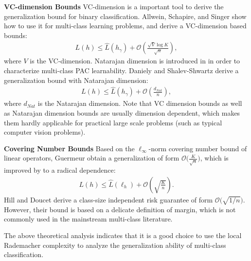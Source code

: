 \documentclass{article}
\begin{document}
\textbf{VC-dimension Bounds}
VC-dimension is a important tool to derive the generalization bound for binary classification.
Allwein, Schapire, and Singer  show how to use it
for multi-class learning problems,
and derive a VC-dimension based bounds:
\begin{align*}
   L(h)\leq  \hat{L}(h_\gamma) +\mathcal{O}\left(\frac{\sqrt{V}\log K}{\sqrt{n}}\right),
\end{align*}
where $V$ is the VC-dimension.
Natarajan dimension is introduced in \cite{Natarajan1989} in
order to characterize multi-class PAC learnability.
Daniely and Shalev-Shwartz  derive a generalization bound with Natarajan dimension:
\begin{align*}
   L(h)\leq  \hat{L}(h_\gamma) +\mathcal{O}\left(\frac{d_{Nat}}{n}\right),
\end{align*}
where $d_{Nat}$ is the Natarajan dimension.
Note that VC dimension bounds as well as Natarajan dimension bounds are usually dimension
dependent, which makes them hardly applicable for practical large
scale problems (such as typical computer vision problems).

\textbf{Covering Number Bounds}
Based on the $\ell_\infty$-norm covering number bound of
linear operators, Guermeur  obtain
a generalization of form $\mathcal{O}\big(\frac{K}{\sqrt{n}}\big)$,
which is improved by \cite{zhang2004statistical} to a radical dependence:
  \begin{align*}
   L(h)\leq  \hat{L}(\ell_h) +\mathcal{O}\left(\sqrt{\frac{K}{n}}\right).
\end{align*}
Hill and Doucet  derive a class-size independent risk guarantee
of form $\mathcal{O}\big(\sqrt{{1}/{n}}\big)$.
However, their bound is based on a delicate definition of margin,
which is not commonly  used in the mainstream multi-class literature.

The above theoretical analysis indicates that it is a good
choice to use the local Rademacher complexity to analyze the generalization
ability of multi-class classification.
\end{document}
